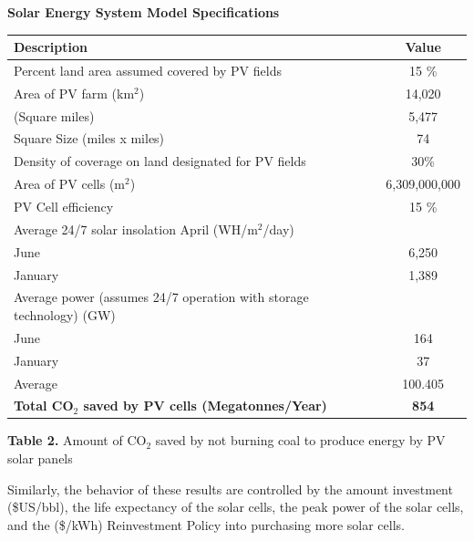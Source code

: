 \documentclass[11pt]{article}
\begin{document}
\begin{center}
{\bf Solar Energy System Model Specifications}
\begin{tabular}{|l|c|}
\hline
\cellcolor{gray!35} {\bf Description} & \cellcolor{gray!35} {\bf Value} \\
\hline
Percent land area assumed covered by PV fields & 15 \% \\ 
\hline
Area of PV farm (km$^2$) & 14,020 \\
\hline
\hspace{24.5em} (Square miles) & 5,477 \\
\hline
\hspace{19em} Square Size (miles x miles) & 74 \\
\hline
Density of coverage on land designated  for PV fields & 30\% \\
\hline
Area of PV cells (m$^2$) &  6,309,000,000 \\ 
\hline
PV Cell efficiency & 15 \% \\
\hline
Average 24/7 solar insolation April (WH/m$^2$/day) &  \\
\hline
\hspace{29.5em}June & 6,250 \\
\hline
\hspace{28em}January & 1,389 \\
\hline
Average power (assumes 24/7 operation with storage technology) (GW) & \\
\hline
\hspace{29.5em}June & 164 \\
\hline
\hspace{28em}January & 37 \\
\hline
\hspace{28em}Average & 100.405 \\
\hline  
{\bf Total CO$_2$ saved by PV cells (Megatonnes/Year)} & {\bf 854} \\
\hline
\end{tabular}
\end{center}

\begin{center}
{\bf Table 2.} Amount of CO$_2$ saved by not burning coal to produce energy by PV solar panels
\end{center}

Similarly, the behavior of these results are controlled by the amount investment (\$US/bbl), the life expectancy of the solar cells, the peak power of the solar cells, and the (\$/kWh) Reinvestment Policy into purchasing more solar cells. 
\end{document}
